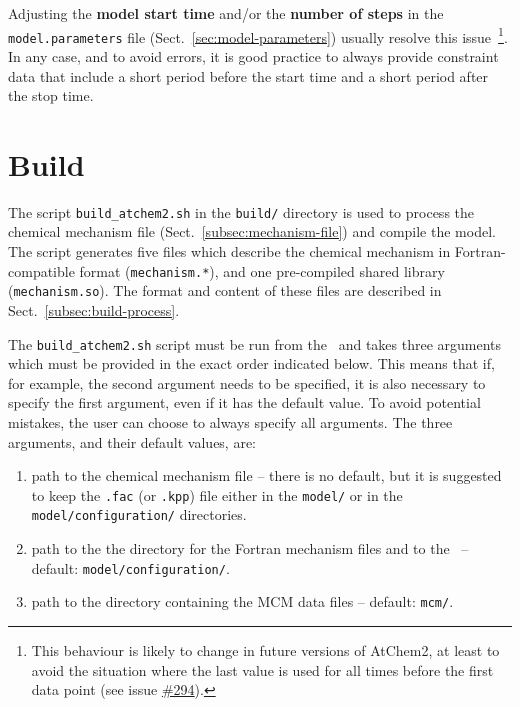 Adjusting the \textbf{model start time} and/or the \textbf{number of steps}
in the \texttt{model.parameters} file (Sect.~\ref{sec:model-parameters})
usually resolve this issue~\footnote{This behaviour is likely to change
  in future versions of AtChem2, at least to avoid the situation where
  the last value is used for all times before the first data point
  (see issue \href{https://github.com/AtChem/AtChem2/issues/294}{\#294}).}.
In any case, and to avoid errors, it is good practice to always
provide constraint data that include a short period before the start
time and a short period after the stop time.

\section{Build} \label{sec:build}

The script \texttt{build\_atchem2.sh} in the \texttt{build/}
directory is used to process the chemical mechanism file
(Sect.~\ref{subsec:mechanism-file}) and compile the model.
The script generates five files which describe the chemical mechanism
in Fortran-compatible format (\texttt{mechanism.*}), and one
pre-compiled shared library (\texttt{mechanism.so}). The format and
content of these files are described in Sect.~\ref{subsec:build-process}.

The \texttt{build\_atchem2.sh} script must be run from the \maindir\
and takes three arguments which must be provided in the exact order
indicated below. This means that if, for example, the second argument
needs to be specified, it is also necessary to specify the first
argument, even if it has the default value. To avoid potential
mistakes, the user can choose to always specify all arguments. The
three arguments, and their default values, are:

\begin{enumerate}
\item path to the chemical mechanism file -- there is no default, but
  it is suggested to keep the \texttt{.fac} (or \texttt{.kpp}) file
  either in the \texttt{model/} or in the
  \texttt{model/configuration/} directories.
\item path to the the directory for the Fortran mechanism files and to
  the \sharedir\ -- default: \texttt{model/configuration/}.
\item path to the directory containing the MCM data files -- default:
  \texttt{mcm/}.
\end{enumerate}

